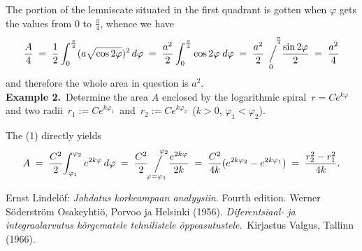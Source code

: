 \documentclass[12pt]{article}
\newcommand{\sijoitus}[2]%
{\operatornamewithlimits{\Big/}_{\!\!\!#1}^{\,#2}}
\theoremstyle{definition}
\begin{document}
The portion of the lemniscate situated in the first quadrant is gotten when $\varphi$ gets the values from 0 to $\frac{\pi}{4}$, whence we have
$$\frac{A}{4} \;=\; \frac{1}{2}\int_0^{\frac{\pi}{4}}(a\sqrt{\cos{2\varphi}})^2\,d\varphi 
\;=\; \frac{a^2}{2}\int_0^{\frac{\pi}{4}}\cos{2\varphi}\;d\varphi 
\;=\; \frac{a^2}{2}\!\sijoitus{0}{\quad\frac{\pi}{4}}\!\frac{\sin{2\varphi}}{2}  \;=\; \frac{a^2}{4}$$
and therefore the whole area in question is $a^2$.\\

\textbf{Example 2.}\, Determine the area $A$ enclosed by the logarithmic spiral \,$r = Ce^{k\varphi}$\, and two  radii \,$r_1 := Ce^{k\varphi_1}$\, and\, $r_2 := Ce^{k\varphi_2}$\, ($k > 0$,\; $\varphi_1 < \varphi_2$).

The  (1) directly yields
$$A \;=\; \frac{C^2}{2}\!\int_{\varphi_1}^{\varphi_2}e^{2k\varphi}\,d\varphi 
\;=\; \frac{C^2}{2}\!\sijoitus{\varphi=\varphi_1}{\quad{\varphi_2}}\!\frac{e^{2k\varphi}}{2k} 
\;=\; \frac{C^2}{4k}(e^{2k\varphi_2}-e^{2k\varphi_1}) \;=\;\frac{r_2^2-r_1^2}{4k}.$$


\begin{thebibliography}{9}
 {\sc Ernst Lindel\"of}: {\em Johdatus korkeampaan analyysiin}. Fourth edition. Werner S\"oderstr\"om Osakeyhti\"o, Porvoo ja Helsinki (1956).
 {\em Diferentsiaal- ja integraalarvutus k\~{o}rgematele tehnilistele \~{o}ppeasutustele}.\, Kirjastus Valgus, Tallinn  (1966).
\end{thebibliography}

\end{document}
